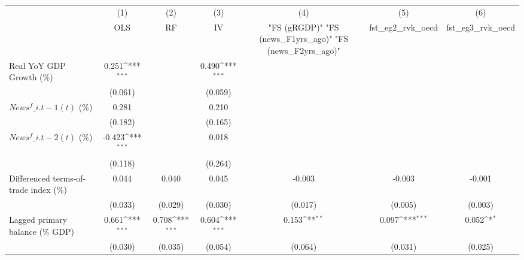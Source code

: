 {
\def\sym#1{\ifmmode^{#1}\else\(^{#1}\)\fi}
\begin{tabular}{l*{6}{c}}
\toprule
                    &\multicolumn{1}{c}{(1)}&\multicolumn{1}{c}{(2)}&\multicolumn{1}{c}{(3)}&\multicolumn{1}{c}{(4)}&\multicolumn{1}{c}{(5)}&\multicolumn{1}{c}{(6)}\\
                    &\multicolumn{1}{c}{OLS}&\multicolumn{1}{c}{RF}&\multicolumn{1}{c}{IV}&\multicolumn{1}{c}{ "FS (gRGDP)"  "FS (news\_F1yrs\_ago)"  "FS (news\_F2yrs\_ago)" }&\multicolumn{1}{c}{fst\_eg2\_rvk\_oecd}&\multicolumn{1}{c}{fst\_eg3\_rvk\_oecd}\\
\midrule
Real YoY GDP Growth (\%)&       0.251\sym{***}&                     &       0.490\sym{***}&                     &                     &                     \\
                    &     (0.061)         &                     &     (0.059)         &                     &                     &                     \\
\addlinespace
$ News^f\_{i.t-1}(t)$ (\%)&       0.281         &                     &       0.210         &                     &                     &                     \\
                    &     (0.182)         &                     &     (0.165)         &                     &                     &                     \\
\addlinespace
$ News^f\_{i.t-2}(t)$ (\%)&      -0.423\sym{***}&                     &       0.018         &                     &                     &                     \\
                    &     (0.118)         &                     &     (0.264)         &                     &                     &                     \\
\addlinespace
Differenced terms-of-trade index (\%)&       0.044         &       0.040         &       0.045         &      -0.003         &      -0.003         &      -0.001         \\
                    &     (0.033)         &     (0.029)         &     (0.030)         &     (0.017)         &     (0.005)         &     (0.003)         \\
\addlinespace
Lagged primary balance (\% GDP)&       0.661\sym{***}&       0.708\sym{***}&       0.604\sym{***}&       0.153\sym{**} &       0.097\sym{***}&       0.052\sym{*}  \\
                    &     (0.030)         &     (0.035)         &     (0.054)         &     (0.064)         &     (0.031)         &     (0.025)         \\

\end{tabular}}
